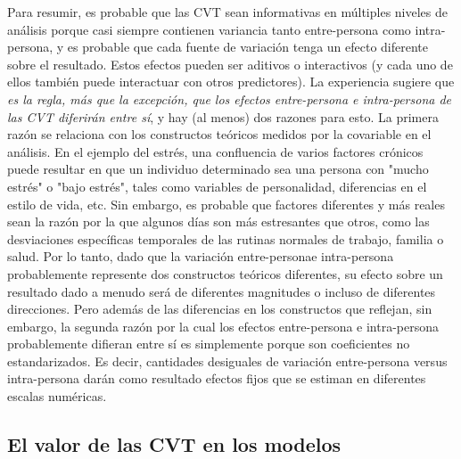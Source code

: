 \documentclass[spanish]{article}
\numberwithin{figure}{subsection}
\numberwithin{equation}{subsection}
\numberwithin{table}{subsection}
\begin{document}
Para resumir, es probable que las CVT sean informativas en múltiples niveles de análisis porque casi siempre
contienen variancia tanto entre-persona como intra-persona, y es probable que cada fuente de variación tenga
un efecto diferente sobre el resultado. Estos efectos pueden ser aditivos o interactivos (y cada uno de ellos
también puede interactuar con otros predictores). La experiencia sugiere que \textit{es la regla, más que la
excepción, que los efectos entre-persona e intra-persona de las CVT diferirán entre sí}, y hay (al menos) dos
razones para esto. La primera razón se relaciona con los constructos teóricos medidos por la covariable en
el análisis. En el ejemplo del estrés, una confluencia de varios factores crónicos puede resultar en que un
individuo determinado sea una persona con "mucho estrés" o "bajo estrés", tales como variables de personalidad,
diferencias en el estilo de vida, etc. Sin embargo, es probable que factores diferentes y más reales sean la
razón por la que algunos días son más estresantes que otros, como las desviaciones específicas temporales de
las rutinas normales de trabajo, familia o salud. Por lo tanto, dado que la variación entre-personae intra-persona
probablemente represente dos constructos teóricos diferentes, su efecto sobre un resultado dado a menudo será
de diferentes magnitudes o incluso de diferentes direcciones. Pero además de las diferencias en los constructos
que reflejan, sin embargo, la segunda razón por la cual los efectos entre-persona e intra-persona probablemente
difieran entre sí es simplemente porque son coeficientes no estandarizados. Es decir, cantidades desiguales de
variación entre-persona versus intra-persona darán como resultado efectos fijos que se estiman en diferentes
escalas numéricas.

\subsection{El valor de las CVT en los modelos}


\newpage
\nocite{*}
\renewcommand{\refname}{Bibliografía}

\end{document}
